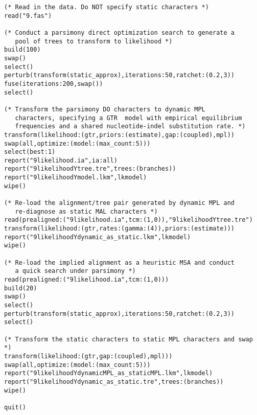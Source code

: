 \begin{verbatim}
(* Read in the data. Do NOT specify static characters *)
read("9.fas")

(* Conduct a parsimony direct optimization search to generate a
   pool of trees to transform to likelihood *)
build(100)
swap()
select()
perturb(transform(static_approx),iterations:50,ratchet:(0.2,3))
fuse(iterations:200,swap())
select()

(* Transform the parsimony DO characters to dynamic MPL
   characters, specifying a GTR  model with empirical equilibrium
   frequencies and a shared nucleotide-indel substitution rate. *)
transform(likelihood:(gtr,priors:(estimate),gap:(coupled),mpl))
swap(all,optimize:(model:(max_count:5)))
select(best:1)
report("9likelihood.ia",ia:all)
report("9likelihoodYtree.tre",trees:(branches))
report("9likelihoodYmodel.lkm",lkmodel)
wipe()

(* Re-load the alignment/tree pair generated by dynamic MPL and
   re-diagnose as static MAL characters *)
read(prealigned:("9likelihood.ia",tcm:(1,0)),"9likelihoodYtree.tre")
transform(likelihood:(gtr,rates:(gamma:(4)),priors:(estimate)))
report("9likelihoodYdynamic_as_static.lkm",lkmodel)
wipe()

(* Re-load the implied alignment as a heuristic MSA and conduct
   a quick search under parsimony *)
read(prealigned:("9likelihood.ia",tcm:(1,0)))
build(20)
swap()
select()
perturb(transform(static_approx),iterations:50,ratchet:(0.2,3))
select()

(* Transform the static characters to static MPL characters and swap *)
transform(likelihood:(gtr,gap:(coupled),mpl)))
swap(all,optimize:(model:(max_count:5)))
report("9likelihoodYdynamicMPL_as_staticMPL.lkm",lkmodel)
report("9likelihoodYdynamic_as_static.tre",trees:(branches))
wipe()

quit()
\end{verbatim}

